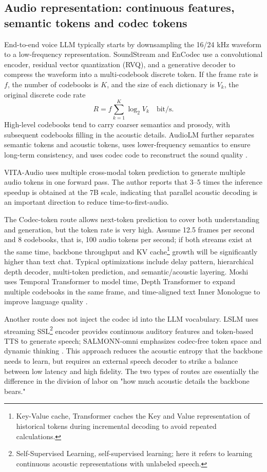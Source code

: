 \documentclass[UTF8,fontset=none,a4paper,10pt]{ctexart}
\begin{document}
\subsection{Audio representation: continuous features, semantic tokens and codec tokens}

End-to-end voice LLM typically starts by downsampling the 16/24 kHz waveform to a low-frequency representation. SoundStream and EnCodec use a convolutional encoder, residual vector quantization (RVQ), and a generative decoder to compress the waveform into a multi-codebook discrete token\cite{en:zeghidour2021soundstream,en:defossez2022encodec}. If the frame rate is $f$, the number of codebooks is $K$, and the size of each dictionary is $V_k$, the original discrete code rate
\begin{equation}
R=f\sum_{k=1}^{K}\log_2V_k\quad\text{bit/s}.
\end{equation}
High-level codebooks tend to carry coarser semantics and prosody, with subsequent codebooks filling in the acoustic details. AudioLM further separates semantic tokens and acoustic tokens, uses lower-frequency semantics to ensure long-term consistency, and uses codec code to reconstruct the sound quality \cite{en:borsos2022audiolm}.

VITA-Audio uses multiple cross-modal token prediction to generate multiple audio tokens in one forward pass. The author reports that 3--5 times the inference speedup\cite{en:long2025vitaaudio} is obtained at the 7B scale, indicating that parallel acoustic decoding is an important direction to reduce time-to-first-audio.

The Codec-token route allows next-token prediction to cover both understanding and generation, but the token rate is very high. Assume 12.5 frames per second and 8 codebooks, that is, 100 audio tokens per second; if both streams exist at the same time, backbone throughput and KV cache\footnote{Key-Value cache, Transformer caches the Key and Value representation of historical tokens during incremental decoding to avoid repeated calculations. } growth will be significantly higher than text chat. Typical optimizations include delay pattern, hierarchical depth decoder, multi-token prediction, and semantic/acoustic layering. Moshi uses Temporal Transformer to model time, Depth Transformer to expand multiple codebooks in the same frame, and time-aligned text Inner Monologue to improve language quality \cite{en:defossez2024moshi}.

Another route does not inject the codec id into the LLM vocabulary. LSLM uses streaming SSL\footnote{Self-Supervised Learning, self-supervised learning; here it refers to learning continuous acoustic representations with unlabeled speech. } encoder provides continuous auditory features and token-based TTS to generate speech; SALMONN-omni emphasizes codec-free token space and dynamic thinking \cite{en:ma2025lslm,en:yu2025salmonnomni}. This approach reduces the acoustic entropy that the backbone needs to learn, but requires an external speech decoder to strike a balance between low latency and high fidelity. The two types of routes are essentially the difference in the division of labor on "how much acoustic details the backbone bears."
\end{document}
